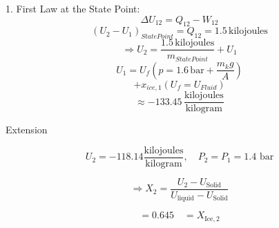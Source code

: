 1. First Law at the State Point:
\[
\Delta U_{12} = Q_{12} - W_{12}
\]
\[
(U_2 - U_1)_{State Point} = Q_{12} = 1.5 \, \text{kilojoules}
\]
\[
\Rightarrow U_2 = \frac{1.5 \, \text{kilojoules}}{m_{State Point}} + U_1
\]
\[
U_1 = U_f \left( p = 1.6 \, \text{bar} + \frac{m_k g}{A} \right)
\]
\[
+ x_{ice,1} (U_f = U_{Fluid})
\]
\[
\approx -133.45 \, \frac{\text{kilojoules}}{\text{kilogram}}
\]

Extension

\[
U_2 = -118.14 \frac{\text{kilojoules}}{\text{kilogram}}, \quad P_2 = P_1 = 1.4 \text{ bar}
\]

\[
\Rightarrow X_2 = \frac{U_2 - U_{\text{Solid}}}{U_{\text{liquid}} - U_{\text{Solid}}}
\]

\[
= 0.645 \quad = X_{\text{Ice},2}
\]